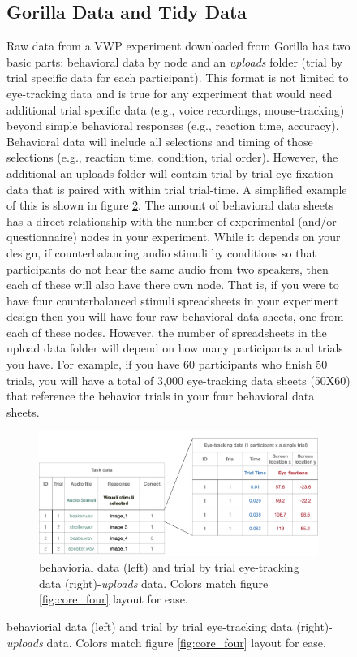 \begin{figure}[h]
\subsection{Gorilla Data and Tidy Data}

Raw data from a VWP experiment downloaded from Gorilla has two basic parts: behavioral data by node and an \textit{uploads} folder (trial by trial specific data for each participant). This format is not limited to eye-tracking data and is true for any experiment that would need additional trial specific data (e.g., voice recordings, mouse-tracking) beyond simple behavioral responses (e.g., reaction time, accuracy). Behavioral data will include all selections and timing of those selections (e.g., reaction time, condition, trial order). However, the additional an uploads folder will contain trial by trial eye-fixation data that is paired with within trial trial-time.  A simplified example of this is shown in figure \ref{fig:data_structure}. The amount of behavioral data sheets has a direct relationship with the number of experimental (and/or questionnaire) nodes in your experiment. While it depends on your design, if counterbalancing audio stimuli by conditions so that participants do not hear the same audio from two speakers, then each of these will also have there own node. That is, if you were to have four counterbalanced stimuli spreadsheets in your experiment design then you will have four raw behavioral data sheets, one from each of these nodes. However, the number of spreadsheets in the upload data folder will depend on how many participants and trials you have. For example, if you have 60 participants who finish 50 trials, you will have a total of 3,000 eye-tracking data sheets (50X60) that reference the behavior trials in your four behavioral data sheets.

\begin{figure}[ht]
    \centering
    \includegraphics[scale=.2]{figures/data_structure.png}
    \caption{behaviorial data (left) and trial by trial eye-tracking data (right)-\textit{uploads} data. Colors match figure \ref{fig:core_four} layout for ease.}
    \label{fig:data_structure}
\end{figure}


\end{figure}
